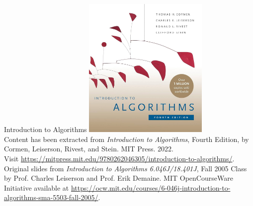 \documentclass{beamer}
\begin{document}
\begin{frame}{Introduction to Algorithms}
    \centering
    \includegraphics[width=0.45\textwidth]{figures/book_cover.jpg} \\
    \vspace{5mm}
    {
        \tiny
        Content has been extracted from \textit{Introduction to Algorithms}, Fourth Edition, by Cormen, Leiserson, Rivest, and Stein. MIT Press. 2022.\\
        Visit \url{https://mitpress.mit.edu/9780262046305/introduction-to-algorithms/}.\\
        Original slides from \textit{Introduction to Algorithms 6.046J/18.401J}, Fall 2005 Class by Prof. Charles Leiserson and Prof. Erik Demaine. MIT OpenCourseWare Initiative available at \url{https://ocw.mit.edu/courses/6-046j-introduction-to-algorithms-sma-5503-fall-2005/}.\\
    }
\end{frame}
\end{document}
